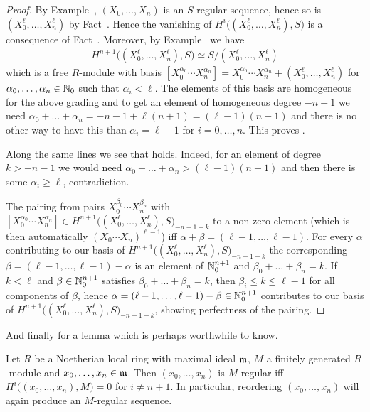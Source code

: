 \documentclass[a4paper,parskip=half,numbers=enddot, DIV=12]{scrreprt}
\begin{document}
\begin{proof}
	By Example~, $(X_0,\ldots,X_n)$ is an $S$-regular sequence, hence so is $(X_0^\ell,\ldots,X_n^\ell)$ by Fact~. Hence the vanishing of $H^i\big((X_0^\ell,\ldots,X_n^\ell),S\big)$ is a consequence of Fact~. Moreover, by Example~ we have 
	\begin{align*}
		H^{n+1}\big((X_0^\ell,\ldots,X_n^\ell),S\big)\simeq S/(X_0^\ell,\ldots,X_n^\ell) 
	\end{align*}
	which is a free $R$-module with basis $[X_0^{\alpha_0}\cdots X_n^{\alpha_n}]=X_0^{\alpha_0}\cdots X_n^{\alpha_n}+(X_0^\ell,\ldots,X_n^\ell)$ for $\alpha_0,\ldots,\alpha_n\in \mathbb{N}_0$ such that $\alpha_i<\ell$. The elements of this basis are homogeneous for the above grading and to get an element of homogeneous degree $-n-1$ we need $\alpha_0+\ldots+\alpha_n=-n-1+\ell(n+1)=(\ell-1)(n+1)$ and there is no other way to have this than $\alpha_i=\ell-1$ for $i=0,\ldots,n$. This proves .
	
	Along the same lines we see that  holds. Indeed, for an element of degree $k>-n-1$ we would need $\alpha_0+\ldots+\alpha_n>(\ell-1)(n+1)$ and then there is some $\alpha_i\geq \ell$, contradiction.
	
	The pairing from  pairs $X_0^{\beta_0}\cdots X_n^{\beta_n}$ with $[X_0^{\alpha_0}\cdots X_n^{\alpha_n}]\in H^{n+1}\big((X_0^\ell,\ldots,X_n^\ell),S\big)_{-n-1-k}$ to a non-zero element (which is then automatically $(X_0\cdots X_n)^{\ell-1}$) iff $\alpha+\beta=(\ell-1,\ldots,\ell-1)$. For every $\alpha$ contributing to our basis of $H^{n+1}\big((X_0^\ell,\ldots,X_n^\ell),S\big)_{-n-1-k}$ the corresponding $\beta=(\ell-1,\ldots,\ell-1)-\alpha$ is an element of $\mathbb{N}_0^{n+1}$ and $\beta_0+\ldots+\beta_n=k$. If $k<\ell$ and $\beta\in\mathbb{N}_0^{n+1}$ satisfies $\beta_0+\ldots+\beta_n=k$, then $\beta_i\leq k\leq\ell-1$ for all components of $\beta$, hence $\alpha=(\ell-1,\ldots,\ell-1)-\beta\in\mathbb{N}_0^{n+1}$ contributes to our basis of $H^{n+1}\big((X_0^\ell,\ldots,X_n^\ell),S\big)_{-n-1-k}$, showing perfectness of the pairing.
\end{proof}
And finally for a lemma which is perhaps worthwhile to know.
\begin{lem}
	Let $R$ be a Noetherian local ring with maximal ideal $\mathfrak{m}$, $M$ a finitely generated $R$-module and $x_0,\ldots,x_n\in\mathfrak{m}$. Then $(x_0,\ldots,x_n)$ is $M$-regular iff $H^i\big((x_0,\ldots,x_n),M\big)=0$ for $i\neq n+1$. In particular, reordering $(x_0,\ldots,x_n)$ will again produce an $M$-regular sequence.
\end{lem}
\end{document}
